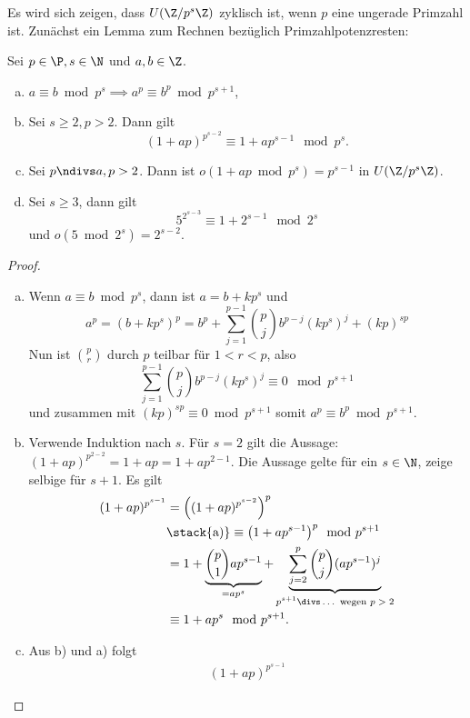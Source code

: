 Es wird sich zeigen, dass $U(\Z / p^s \Z)$ zyklisch ist, wenn $p$ eine ungerade Primzahl ist.
Zunächst ein Lemma zum Rechnen bezüglich Primzahlpotenzresten:

\begin{lem} \label{2.7}
	Sei $p \in \P, s \in \N$ und $a, b \in \Z$.
	\begin{enumerate}[a)]
		\item
			$a \equiv b \bmod p^s \implies a^p \equiv b^p \bmod p^{s+1}$,
		\item
			Sei $s \ge 2, p > 2$.
			Dann gilt
			\[
				(1 + ap)^{p^{s-2}}
				\equiv 1 + ap^{s-1} \mod p^s.
			\]
		\item
			Sei $p \ndivs a, p > 2$.
			Dann ist $o(1 + ap \bmod p^s) = p^{s-1}$ in $U(\Z / p^s \Z)$.
		\item
			Sei $s \ge 3$, dann gilt
			\[
				5^{2^{s-3}} \equiv 1 + 2^{s-1} \mod 2^s
			\]
			und $o(5 \bmod 2^s) = 2^{s-2}$.
	\end{enumerate}
	\begin{proof}
		\begin{enumerate}[a)]
			\item
				Wenn $a \equiv b \bmod p^s$, dann ist $a = b + k p^s$ und
				\[
					a^p
					= (b + kp^s)^p
					= b^p + \sum_{j=1}^{p-1} \binom{p}{j} b^{p-j} (kp^s)^j + (kp)^{sp}
				\]
				Nun ist $\binom{p}{r}$ durch $p$ teilbar für $1 < r < p$, also
				\[
					\sum_{j=1}^{p-1} \binom{p}{j} b^{p-j} (kp^s)^j \equiv 0 \mod p^{s+1}
				\]
				und zusammen mit $(kp)^{sp} \equiv 0 \bmod p^{s+1}$ somit $a^p \equiv b^p \bmod p^{s+1}$.
			\item
{}
				Verwende Induktion nach $s$.
				Für $s = 2$ gilt die Aussage: $(1 + ap)^{p^{2-2}} = 1 + ap = 1 + ap^{2-1}$.
				Die Aussage gelte für ein $s \in \N$, zeige selbige für $s + 1$.
				Es gilt
				\begin{align*}
					(1 + ap)^{p^{s-1}}
					&= \Big((1 + ap)^{p^{s-2}}\Big)^p \\
					&\stack{\text{a)}}\equiv \big(1 + ap^{s-1} \big)^p \mod p^{s+1} \\
					&= 1 + \underbrace{\binom{p}{1} ap^{s-1}}_{= ap^s} + \underbrace{\sum_{j=2}^p \binom{p}{j} (ap^{s-1})^j}_{\text{$p^{s+1} \divs \dotsc$ wegen $p > 2$}} \\
					&\equiv 1 + ap^s \mod p^{s+1}.
				\end{align*}
			\item
				Aus b) und a) folgt
				\begin{align*}
					(1 + ap)^{p^{s-1}}

\end{align*}
\end{enumerate}
\end{proof}
\end{lem}
